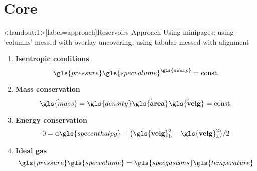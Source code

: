 \documentclass[compress, english]{beamer}%
\begin{document}
\section{Core}
\begin{frame}<handout:1>[label=approach]{Reservoirs Approach}
 Using minipages; using 'columns' messed with overlay uncovering; using tabular messed with alignment
\begin{minipage}[c]{0.45\textwidth}
\begin{figure}
	\def\svgwidth{1\linewidth}
	
\end{figure}
\end{minipage}
\pause
\hspace*{\fill}
\begin{minipage}[c]{0.45\textwidth}
\begin{enumerate}
\item \textbf{Isentropic conditions}
\begin{equation*}
\gls{pressure}\gls{specvolume}^{\gls{adexp}} = \text{\const{}}
\end{equation*}
\item \textbf{Mass conservation}
\begin{equation*}
\dot{\gls{mass}} = \gls{density} \vect{\gls{area}}{} \vect{\gls{velg}}{} = \text{\const{}}
\end{equation*}
\item \textbf{Energy conservation}
\begin{equation*}
0 = \dd{\gls{specenthalpy}} + \big(\vectcomp{\gls{velg}}{b}{}^2 - \vectcomp{\gls{velg}}{a}{}^2\big) / 2
\end{equation*}
\item \textbf{Ideal gas}
\begin{equation*}
\gls{pressure}\gls{specvolume} = \gls{specgascons}\gls{temperature}
\end{equation*}
\end{enumerate}
\end{minipage}
\end{frame}
\end{document}
